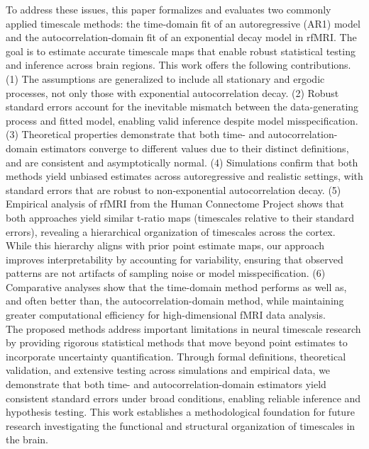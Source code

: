 \documentclass[latex/main.tex]{subfiles}
\begin{document}
To address these issues, this paper formalizes and evaluates two commonly applied timescale methods: the time-domain fit of an autoregressive (AR1) model and the autocorrelation-domain fit of an exponential decay model in rfMRI. The goal is to estimate accurate timescale maps that enable robust statistical testing and inference across brain regions. This work offers the following contributions. (1) The assumptions are generalized to include all stationary and ergodic processes, not only those with exponential autocorrelation decay. (2) Robust standard errors account for the inevitable mismatch between the data-generating process and fitted model, enabling valid inference despite model misspecification. (3) Theoretical properties demonstrate that both time- and autocorrelation-domain estimators converge to different values due to their distinct definitions, and are consistent and asymptotically normal. (4) Simulations confirm that both methods yield unbiased estimates across autoregressive and realistic settings, with standard errors that are robust to non-exponential autocorrelation decay. (5) Empirical analysis of rfMRI from the Human Connectome Project shows that both approaches yield similar t-ratio maps (timescales relative to their standard errors), revealing a hierarchical organization of timescales across the cortex. While this hierarchy aligns with prior point estimate maps, our approach improves interpretability by accounting for variability, ensuring that observed patterns are not artifacts of sampling noise or model misspecification. (6) Comparative analyses show that the time-domain method performs as well as, and often better than, the autocorrelation-domain method, while maintaining greater computational efficiency for high-dimensional fMRI data analysis.\\

The proposed methods address important limitations in neural timescale research by providing rigorous statistical methods that move beyond point estimates to incorporate uncertainty quantification. Through formal definitions, theoretical validation, and extensive testing across simulations and empirical data, we demonstrate that both time- and autocorrelation-domain estimators yield consistent standard errors under broad conditions, enabling reliable inference and hypothesis testing. This work establishes a methodological foundation for future research investigating the functional and structural organization of timescales in the brain.
\end{document}

